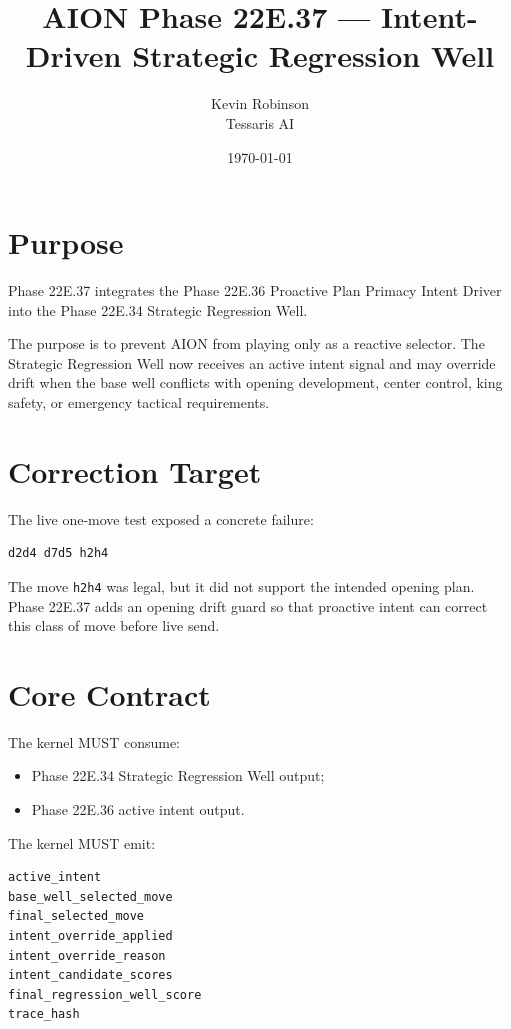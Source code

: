 \documentclass[11pt,a4paper]{article}
\title{\textbf{AION Phase 22E.37 --- Intent-Driven Strategic Regression Well}}
\author{Kevin Robinson\\Tessaris AI}
\date{\today}
\begin{document}
\maketitle

\section{Purpose}

Phase 22E.37 integrates the Phase 22E.36 Proactive Plan Primacy Intent Driver into the Phase 22E.34 Strategic Regression Well.

The purpose is to prevent AION from playing only as a reactive selector. The Strategic Regression Well now receives an active intent signal and may override drift when the base well conflicts with opening development, center control, king safety, or emergency tactical requirements.

\section{Correction Target}

The live one-move test exposed a concrete failure:

\begin{verbatim}
d2d4 d7d5 h2h4
\end{verbatim}

The move \texttt{h2h4} was legal, but it did not support the intended opening plan. Phase 22E.37 adds an opening drift guard so that proactive intent can correct this class of move before live send.

\section{Core Contract}

The kernel MUST consume:

\begin{itemize}[leftmargin=*]
  \item Phase 22E.34 Strategic Regression Well output;
  \item Phase 22E.36 active intent output.
\end{itemize}

The kernel MUST emit:

\begin{verbatim}
active_intent
base_well_selected_move
final_selected_move
intent_override_applied
intent_override_reason
intent_candidate_scores
final_regression_well_score
trace_hash
\end{verbatim}
\end{document}
